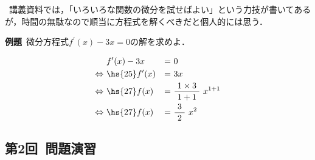 \documentclass[a4paper,11pt]{ltjsarticle}
\begin{document}
\ast\ 講義資料では，「いろいろな関数の微分を試せばよい」という力技が書いてあるが，時間の無駄なので順当に方程式を解くべきだと個人的には思う．


\textbf{例題}\ 微分方程式$f^{\prime}(x)-3x=0$の解を求めよ．

\begin{equation*}
  \begin{aligned}
                   \ & f^{\prime}(x)-3x      &=&\ 0 \\
    \Leftrightarrow\ & \hs{25} f^{\prime}(x) &=&\ 3x \\
    \Leftrightarrow\ & \hs{27} f(x)          &=&\ \dfrac{1 \times 3}{\ 1+1\ }\ x^{1+1} \\
    \Leftrightarrow\ & \hs{27} f(x)          &=&\ \dfrac{3}{\ 2\ }\ x^{2}
  \end{aligned}
\end{equation*}

\subsection{第2回\ 問題演習}
\end{document}
